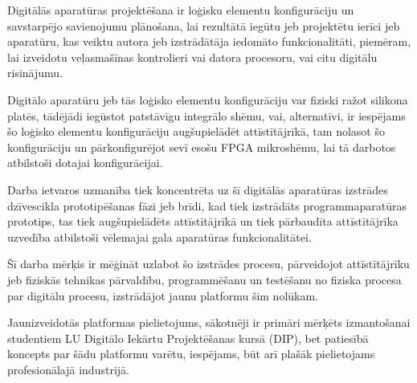 Digitālās aparatūras projektēšana ir loģisku elementu konfigurāciju un savstarpējo savienojumu plānošana, lai
rezultātā iegūtu jeb projektētu ierīci jeb aparatūru, kas veiktu autora jeb izstrādātāja iedomāto funkcionalitāti, piemēram,
lai izveidotu veļasmašīnas kontrolieri vai datora procesoru, vai citu digitālu risinājumu.  
  
Digitālo aparatūru jeb tās loģisko elementu konfigurāciju var fiziski ražot silikona platēs, tādējādi iegūstot patstāvīgu integrālo
shēmu, vai, alternatīvi, ir iespējams šo loģisko elementu konfigurāciju augšupielādēt attīstītājrīkā, tam nolasot šo konfigurāciju un 
pārkonfigurējot sevī esošu FPGA mikroshēmu, lai tā darbotos atbilstoši dotajai konfigurācijai.  

Darba ietvaros uzmanība tiek koncentrēta uz šī digitālās aparatūras izstrādes dzīvescikla prototipēšanas fāzi jeb brīdi, kad
tiek izstrādāts programmaparatūras prototips, tas tiek augšupielādēts attīstītājrīkā un tiek pārbaudīta attīstītājrīka uzvedība
atbilstoši vēlemajai gala aparatūras funkcionalitātei.

Šī darba mērķis ir mēģināt uzlabot šo izstrādes procesu, pārveidojot attīstītājrīku jeb fiziskās tehnikas pārvaldību, programmēšanu 
un testēšanu no fiziska procesa par digitālu procesu, izstrādājot jaunu platformu šim nolūkam.

Jaunizveidotās platformas pielietojums, sākotnēji ir primāri mērķēts izmantošanai studentiem LU Digitālo Iekārtu Projektēšanas kursā (DIP),
bet patiesībā koncepts par šādu platformu varētu, iespējams, būt arī plašāk pielietojams profesionālajā industrijā.
  